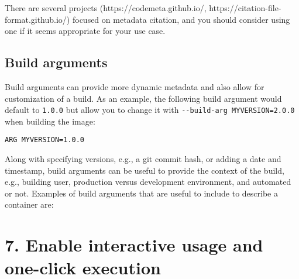 \documentclass[10pt,letterpaper]{article}
\begin{document}
There are several projects (https://codemeta.github.io/,
https://citation-file-format.github.io/) focused on metadata citation,
and you should consider using one if it seems appropriate for your use
case.

\hypertarget{build-arguments}{%
\subsection{Build arguments}\label{build-arguments}}

Build arguments can provide more dynamic metadata and also allow for
customization of a build. As an example, the following build argument
would default to \texttt{1.0.0} but allow you to change it with
\texttt{-\/-build-arg\ MYVERSION=2.0.0} when building the image:

\begin{verbatim}
ARG MYVERSION=1.0.0
\end{verbatim}

Along with specifying versions, e.g., a git commit hash, or adding a
date and timestamp, build arguments can be useful to provide the context
of the build, e.g., building user, production versus development
environment, and automated or not. Examples of build arguments that are
useful to include to describe a container are:

\hypertarget{enable-interactive-usage-and-one-click-execution}{%
\section*{7. Enable interactive usage and one-click
execution}\label{enable-interactive-usage-and-one-click-execution}}
\end{document}
